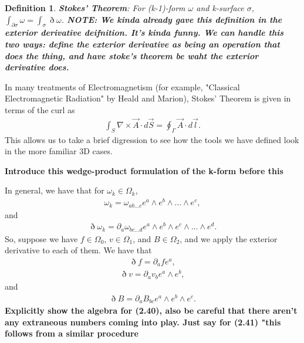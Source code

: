 \documentclass{book}
\newtheorem{defn}[equation]{Definition}
\begin{document}
\begin{defn}
	\textbf{Stokes' Theorem}: For (k-1)-form $\omega$ and k-surface $\sigma$, $\int_{\partial \sigma}\omega = \int_{\sigma}\eth\omega$. \textbf{NOTE: We kinda already gave this definition in the exterior derivative deifnition. It's kinda funny. We can handle this two ways: define the exterior derivative as being an operation that does the thing, and have stoke's theorem be waht the exterior derivative does. }
\end{defn}

In many treatments of Electromagnetism (for example, "Classical Electromagnetic Radiation" by Heald and Marion), Stokes' Theorem is given in terms of the curl as \begin{gather}\int_S \nabla \times \vec{A} \cdot d\vec{S} = \oint_{\Gamma} \vec{A} \cdot d\vec{l}.\end{gather} This allows us to take a brief digression to see how the tools we have defined look in the more familiar 3D cases. 

\textbf{Introduce this wedge-product formulation of the k-form before this}

In general, we have that for $\omega_k \in \Omega_k$, \begin{gather}\omega_k = \omega_{ab...c}e^a\wedge e^b \wedge ... \wedge e^c,\end{gather} and \begin{gather} \eth \omega_k = \partial_a\omega_{bc...d}e^a\wedge e^b\wedge e^c\wedge ... \wedge e^d.\end{gather} So, suppose we have $f \in \Omega_0$, $v \in \Omega_1$, and $B \in \Omega_2$, and we apply the exterior derivative to each of them. We have that \begin{gather}\eth f = \partial_a f e^a,\end{gather} \begin{gather}\eth v = \partial_a v_b e^a \wedge e^b,\end{gather} and \begin{gather}\eth B = \partial_a B_{bc} e^a\wedge e^b \wedge e^c.\end{gather} 
\textbf{Explicitly show the algebra for (2.40), also be careful that there aren't any extraneous numbers coming into play. Just say for (2.41) "this follows from a similar procedure}
\end{document}
